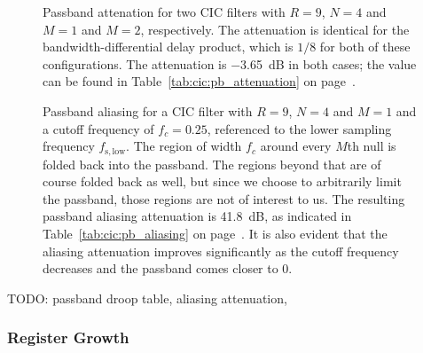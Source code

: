 \begin{figure}
    \centering
        
        \caption[CIC Filter: Passband and Aliasing Attenuation]{%
            Passband  attenation for  two CIC  filters with  $R=9$, $N=4$  and
            $M=1$ and  $M=2$, respectively. The  attenuation is  identical for
            the bandwidth-differential delay product,  which is $1/8$ for both
            of these configurations.\protect\newline
            The   attenuation   is   \SI{-3.65}{\dB}  in   both   cases;   the
            value  can  be   found  in  Table~\ref{tab:cic:pb_attenuation}  on
            page~\pageref{tab:cic:pb_attenuation}.%
        }
        \label{fig:cic:freq_responses:passband:attenuation}
\end{figure}

\begin{figure}
    \centering
        
        \caption[CIC Filter: Passband and Aliasing Attenuation]{%
            Passband aliasing for  a CIC filter with $R =  9$, $N=4$ and $M=1$
            and a  cutoff frequency of $f_c  = 0.25$, referenced to  the lower
            sampling frequency $f_\mathrm{s,low}$.\protect\newline
            The  region of  width  $f_c$  around every  $M$th  null is  folded
            back  into the  passband. The regions  beyond that  are of  course
            folded  back  as   well,  but  since  we   choose  to  arbitrarily
            limit  the  passband,  those  regions   are  not  of  interest  to
            us.\protect\newline
            The  resulting passband  aliasing  attenuation is  \SI{41.8}{\dB},
            as     indicated     in     Table~\ref{tab:cic:pb_aliasing}     on
            page~\pageref{tab:cic:pb_aliasing}.\protect\newline
            It  is  also  evident   that  the  aliasing  attenuation  improves
            significantly as  the cutoff frequency decreases  and the passband
            comes closer to \num{0}.%
        }
        \label{fig:cic:freq_responses:passband:aliasing}
\end{figure}

TODO: passband droop table, aliasing attenuation, 

\subsubsection{Register Growth}
\label{subsubsec:cic:register_growth}

